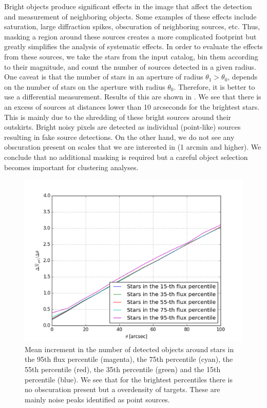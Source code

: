 \documentclass[twocolumn]{aastex62}
\begin{document}
Bright objects produce significant effects in the image that affect the detection and measurement of neighboring objects. Some examples of these effects include saturation, large diffraction spikes, obscuration of neighboring sources, etc. Thus, masking a region around these sources creates a more complicated footprint but greatly simplifies the analysis of systematic effects. In order to evaluate the effects from these sources, we take the stars from the input catalog, bin them according to their magnitude, and count the number of sources detected in a given radius. One caveat is that the number of stars in an aperture of radius $\theta_{1} > \theta_{0}$, depends on the number of stars on the aperture with radius $\theta_{0}$. Therefore, it is better to use a differential measurement. Results of this are shown in . We see that there is an excess of sources at distances lower than 10 arcseconds for the brightest stars. This is mainly due to the shredding of these bright sources around their outskirts. Bright noisy pixels are detected as individual (point-like) sources resulting in fake source detections. On the other hand, we do not see any obscuration present on scales that we are interested in (1 arcmin and higher). We conclude that no additional masking is required but a careful object selection becomes important for clustering analyses.

\begin{figure}
\centering
\includegraphics[width=0.9\columnwidth]{dngal_dtheta.png}
\caption{Mean increment in the number of detected objects around stars in the 95th flux percentile (magenta), the 75th percentile (cyan), the 55th percentile (red), the 35th percentile (green) and the 15th percentile (blue). We see that for the brightest percentiles there is no obscuration present but a overdensity of targets. These are mainly noise peaks identified as point sources.}
\label{fig:galdens_derivative}
\end{figure}
\end{document}
